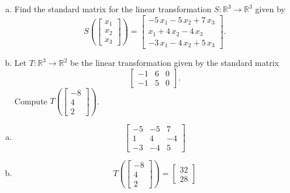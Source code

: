
\begin{exerciseStatement}

\begin{enumerate}[(a)]
\item Find the standard matrix for the linear transformation \(S:\mathbb{R}^ 3  \to \mathbb{R}^ 3 \) given by \[S\left(  \left[\begin{array}{c}
x_{1} \\
x_{2} \\
x_{3}
\end{array}\right]  \right) =  \left[\begin{array}{c}
-5 \, x_{1} - 5 \, x_{2} + 7 \, x_{3} \\
x_{1} + 4 \, x_{2} - 4 \, x_{3} \\
-3 \, x_{1} - 4 \, x_{2} + 5 \, x_{3}
\end{array}\right] .\]
\item Let \(T:\mathbb{R}^ 3  \to \mathbb{R}^ 2 \) be the linear transformation given by the standard matrix \[ \left[\begin{array}{ccc}
-1 & 6 & 0 \\
-1 & 5 & 0
\end{array}\right] .\] Compute \(T\left( \left[\begin{array}{c}
-8 \\
4 \\
2
\end{array}\right]  \right)\). 
\end{enumerate}
    
\end{exerciseStatement}
    
\begin{exerciseAnswer} 

\begin{enumerate}[(a)]
\item \[ \left[\begin{array}{ccc}
-5 & -5 & 7 \\
1 & 4 & -4 \\
-3 & -4 & 5
\end{array}\right] \]
\item \[T\left( \left[\begin{array}{c}
-8 \\
4 \\
2
\end{array}\right]  \right)= \left[\begin{array}{c}
32 \\
28
\end{array}\right] \]
\end{enumerate}
    
\end{exerciseAnswer}
    
